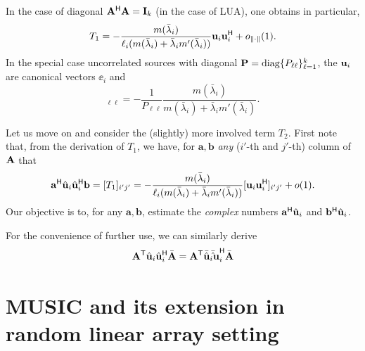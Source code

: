 \documentclass[11pt,a4paper]{article}
\begin{document}
In the case of diagonal ${\mathbf{A}}^{\sf H} {\mathbf{A}} = \mathbf{I}_k$ (in the case of LUA), one obtains in particular,
\begin{equation}
	T_1 = - \frac{m(\bar \lambda_i)}{ \ell_i (m(\bar \lambda_i) + \bar \lambda_i m'(\bar \lambda_i)) } \mathbf{u}_i \mathbf{u}_i^{\sf H} + o_{\| \cdot \|}(1).
\end{equation}
In the special case uncorrelated sources with diagonal $\mathbf{P} = \operatorname{diag}\{ P_{\ell \ell} \}_{\ell=1}^k$, the $\mathbf{u}_i$ are canonical vectors $\ee_i$ and
\begin{equation}
	[T_1]_{\ell \ell} = - \frac1{P_{\ell \ell}} \frac{m(\bar \lambda_i)}{ m(\bar \lambda_i) + \bar \lambda_i m'(\bar \lambda_i) }.
\end{equation}



\medskip

Let us move on and consider the (slightly) more involved term $T_2$. First note that, from the derivation of $T_1$, we have, for $\mathbf{a}, \mathbf{b}$ \emph{any} ($i'$-th and $j'$-th) column of ${\mathbf{A}}$ that
\begin{equation}
	\mathbf{a}^{\sf H} \hat {\mathbf{u}}_i \hat {\mathbf{u}}_i^{\sf H} \mathbf{b} = [T_1]_{i'j'} = - \frac{m(\bar \lambda_i)}{ \ell_i (m(\bar \lambda_i) + \bar \lambda_i m'(\bar \lambda_i)) } [\mathbf{u}_i \mathbf{u}_i^{\sf H}]_{i'j'} + o(1).
\end{equation}
Our objective is to, for any $\mathbf{a},\mathbf{b}$, estimate the \emph{complex} numbers $\mathbf{a}^{\sf H} \hat {\mathbf{u}}_i$ and $\mathbf{b}^{\sf H} \hat {\mathbf{u}}_i$.

For the convenience of further use, we can similarly derive
\begin{equation}
	{\mathbf{A}}^{\sf T} \hat {\mathbf{u}}_i \hat {\mathbf{u}}_i^{\sf H} \bar{{\mathbf{A}}} = {\mathbf{A}}^{\sf T} \bar{\hat {\mathbf{u}}}_i {\bar \hat {\mathbf{u}}}_i^{\sf H} \bar{{\mathbf{A}}}
\end{equation}


\section{MUSIC and its extension in random linear array setting}
\end{document}
